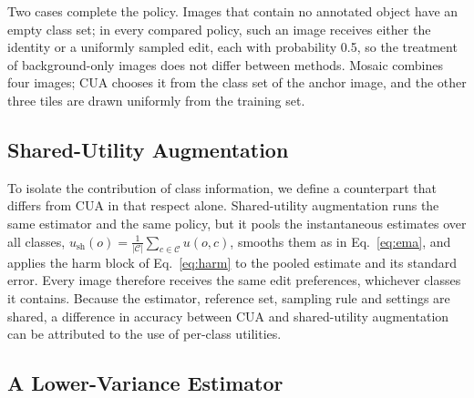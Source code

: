 \documentclass[conference]{IEEEtran}
\begin{document}
Two cases complete the policy. Images that contain no annotated object have an empty class set; in every compared policy, such an image receives either the identity or a uniformly sampled edit, each with probability 0.5, so the treatment of background-only images does not differ between methods. Mosaic combines four images; CUA chooses it from the class set of the anchor image, and the other three tiles are drawn uniformly from the training set.

\subsection{Shared-Utility Augmentation}
\label{sec:method_shared}

To isolate the contribution of class information, we define a counterpart that differs from CUA in that respect alone. Shared-utility augmentation runs the same estimator and the same policy, but it pools the instantaneous estimates over all classes, $u_{\mathrm{sh}}(o)=\frac{1}{|\mathcal{C}|}\sum_{c\in\mathcal{C}}u(o,c)$, smooths them as in Eq.~\eqref{eq:ema}, and applies the harm block of Eq.~\eqref{eq:harm} to the pooled estimate and its standard error. Every image therefore receives the same edit preferences, whichever classes it contains. Because the estimator, reference set, sampling rule and settings are shared, a difference in accuracy between CUA and shared-utility augmentation can be attributed to the use of per-class utilities.

\subsection{A Lower-Variance Estimator}
\label{sec:method_v2}
\end{document}
